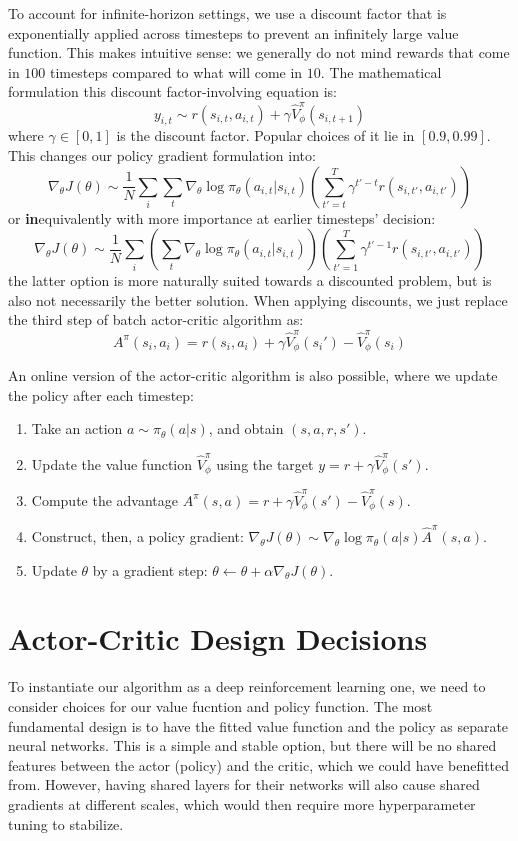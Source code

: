 To account for infinite-horizon settings, we use a discount factor that is exponentially applied across timesteps to prevent an infinitely large value function.
This makes intuitive sense: we generally do not mind rewards that come in $100$ timesteps compared to what will come in $10$.
The mathematical formulation this discount factor-involving equation is:
\[
    y_{i,t} \sim r(s_{i,t}, a_{i,t}) + \gamma \hat{V}_\phi^\pi (s_{i, t+1})
\]
where $\gamma \in [0, 1]$ is the discount factor. Popular choices of it lie in $[0.9, 0.99]$.
This changes our policy gradient formulation into:
\[
    \nabla_\theta J(\theta) \sim \frac{1}{N} \sum_i \sum_t \nabla_\theta \log \pi_\theta (a_{i,t} | s_{i,t}) \left( \sum_{t'=t}^T \gamma^{t'-t} r(s_{i,t'}, a_{i,t'}) \right)
\]
or \textbf{in}equivalently with more importance at earlier timesteps' decision:
\[
    \nabla_\theta J(\theta) \sim \frac{1}{N} \sum_i \left(\sum_t \nabla_\theta \log \pi_\theta (a_{i,t} | s_{i,t})\right) \left( \sum_{t'=1}^T \gamma^{t'-1} r(s_{i,t'}, a_{i,t'}) \right)
\]
the latter option is more naturally suited towards a discounted problem, but is also not necessarily the better solution.
When applying discounts, we just replace the third step of batch actor-critic algorithm as:
\[
    A^\pi (s_i, a_i) = r(s_i, a_i) + \gamma \hat{V}_\phi^\pi (s_i') - \hat{V}_\phi^\pi (s_i)
\]

An online version of the actor-critic algorithm is also possible, where we update the policy after each timestep:
\begin{enumerate}
    \item Take an action $a \sim \pi_\theta (a|s)$, and obtain $(s, a, r, s')$.
    \item Update the value function $\hat{V}_\phi^\pi$ using the target $y = r + \gamma \hat{V}_\phi^\pi (s')$.
    \item Compute the advantage $A^\pi (s, a) = r + \gamma \hat{V}_\phi^\pi (s') - \hat{V}_\phi^\pi (s)$.
    \item Construct, then, a policy gradient: $\nabla_\theta J(\theta) \sim \nabla_\theta \log \pi_\theta (a|s) \hat{A}^\pi (s, a)$.
    \item Update $\theta$ by a gradient step: $\theta \leftarrow \theta + \alpha \nabla_\theta J(\theta)$.
\end{enumerate}

\section{Actor-Critic Design Decisions}
To instantiate our algorithm as a deep reinforcement learning one, we need to consider choices for our value fucntion and policy function.
The most fundamental design is to have the fitted value function and the policy as separate neural networks.
This is a simple and stable option, but there will be no shared features between the actor (policy) and the critic, which we could have benefitted from.
However, having shared layers for their networks will also cause shared gradients at different scales, which would then require more hyperparameter tuning to stabilize.

